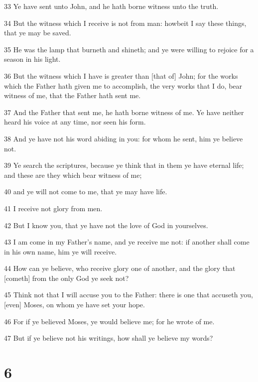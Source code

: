 \par 33 Ye have sent unto John, and he hath borne witness unto the truth.
\par 34 But the witness which I receive is not from man: howbeit I say these things, that ye may be saved.
\par 35 He was the lamp that burneth and shineth; and ye were willing to rejoice for a season in his light.
\par 36 But the witness which I have is greater than [that of] John; for the works which the Father hath given me to accomplish, the very works that I do, bear witness of me, that the Father hath sent me.
\par 37 And the Father that sent me, he hath borne witness of me. Ye have neither heard his voice at any time, nor seen his form.
\par 38 And ye have not his word abiding in you: for whom he sent, him ye believe not.
\par 39 Ye search the scriptures, because ye think that in them ye have eternal life; and these are they which bear witness of me;
\par 40 and ye will not come to me, that ye may have life.
\par 41 I receive not glory from men.
\par 42 But I know you, that ye have not the love of God in yourselves.
\par 43 I am come in my Father's name, and ye receive me not: if another shall come in his own name, him ye will receive.
\par 44 How can ye believe, who receive glory one of another, and the glory that [cometh] from the only God ye seek not?
\par 45 Think not that I will accuse you to the Father: there is one that accuseth you, [even] Moses, on whom ye have set your hope.
\par 46 For if ye believed Moses, ye would believe me; for he wrote of me.
\par 47 But if ye believe not his writings, how shall ye believe my words?

\chapter{6}


